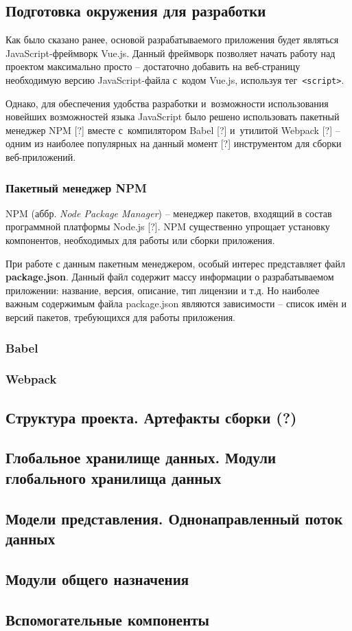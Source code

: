 
\subsection{Подготовка окружения для разработки}

Как было сказано ранее, основой разрабатываемого приложения будет являться JavaScript-фреймворк Vue.js. Данный фреймворк позволяет начать работу над проектом максимально просто -- достаточно добавить на веб-страницу необходимую версию JavaScript-файла с~кодом Vue.js, используя тег \,\verb|<script>|.

Однако, для обеспечения удобства разработки и~возможности использования новейших возможностей языка JavaScript было решено использовать пакетный менеджер NPM [?] вместе с~компилятором Babel [?] и~утилитой Webpack [?] -- одним из наиболее популярных на данный момент [?] инструментом для сборки веб-приложений.


\subsubsection{Пакетный менеджер NPM}

NPM (аббр. \emph{Node Package Manager}) -- менеджер пакетов, входящий в состав программной платформы Node.js [?]. NPM существенно упрощает установку компонентов, необходимых для работы или сборки приложения.

При работе с данным пакетным менеджером, особый интерес представляет файл \textbf{package.json}. Данный файл содержит массу информации о разрабатываемом приложении: название, версия, описание, тип лицензии и т.д. Но наиболее важным содержимым файла package.json являются зависимости -- список имён и версий пакетов, требующихся для работы приложения.


\subsubsection{Babel}


\subsubsection{Webpack}



\subsection{Структура проекта. Артефакты сборки (?)}

\subsection{Глобальное хранилище данных. Модули глобального хранилища данных}

\subsection{Модели представления. Однонаправленный поток данных}

\subsection{Модули общего назначения}

\subsection{Вспомогательные компоненты}

\newpage
